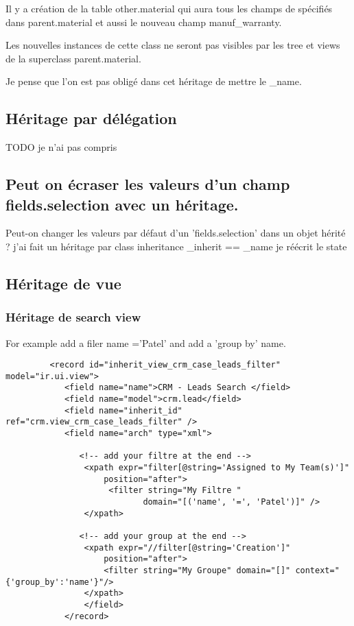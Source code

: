 \documentclass[12pt,a4paper]{article}
\begin{document}
Il y a création de la table other.material qui aura tous les champs de spécifiés dans parent.material et aussi le nouveau champ manuf\_warranty.

Les nouvelles instances de cette class ne seront pas visibles par les tree et views de la superclass parent.material.

Je pense que l'on est pas obligé dans cet héritage de mettre le \_name.

\subsection{Héritage par délégation}
\label{sec:delegation}
TODO je n'ai pas compris


\subsection{Peut on écraser les valeurs d’un champ fields.selection avec un héritage.}
 
Peut-on changer les valeurs par défaut d’un ’fields.selection’ dans un objet hérité ?
j’ai fait un héritage par class inheritance \_inherit == \_name
je réécrit le state

\subsection{Héritage de vue}
\label{sec:inherit_view}

\subsubsection{Héritage de search view}
\label{sec:inherit_search_view}

For example add a filer name ='Patel' and add a 'group by' name.

\begin{verbatim}
         <record id="inherit_view_crm_case_leads_filter" model="ir.ui.view">
            <field name="name">CRM - Leads Search </field>
            <field name="model">crm.lead</field>
            <field name="inherit_id" ref="crm.view_crm_case_leads_filter" />
            <field name="arch" type="xml">

               <!-- add your filtre at the end -->
                <xpath expr="filter[@string='Assigned to My Team(s)']"
                    position="after">
                     <filter string="My Filtre "
                            domain="[('name', '=', 'Patel')]" />
                </xpath>

               <!-- add your group at the end -->
                <xpath expr="//filter[@string='Creation']"
                    position="after">
                    <filter string="My Groupe" domain="[]" context="{'group_by':'name'}"/>
                </xpath>                                    
                </field>
            </record>
\end{verbatim}
\end{document}
